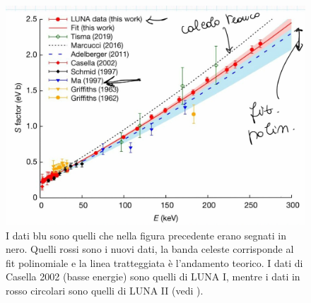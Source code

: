 \begin{figure}[h]
    \centering
    \includegraphics[scale=0.2]{Immagini/0315_fattoreastr2.png}
    \caption{I dati blu sono quelli che nella figura precedente erano segnati in nero. Quelli rossi sono i nuovi dati, la banda celeste corrisponde al fit polinomiale e la linea tratteggiata è l'andamento teorico. I dati di Casella 2002 (basse energie) sono quelli di LUNA I, mentre i dati in rosso circolari sono quelli di LUNA II (vedi ).}
    \label{0315_astr2}
\end{figure}



